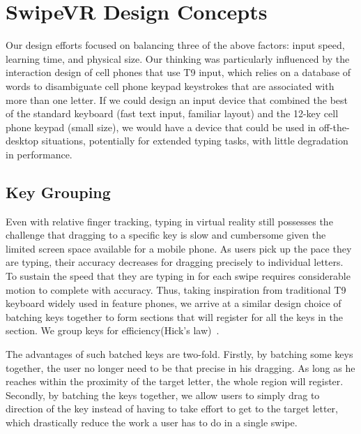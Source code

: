 \section{SwipeVR  Design Concepts }
Our design efforts focused on balancing three of the above factors: input speed, learning time, and physical size.
Our thinking was particularly influenced by the interaction design of cell phones that use T9 input, which relies on a database of words to disambiguate cell phone keypad keystrokes that are associated with more than one letter.
If we could design an input device that combined the best of the standard keyboard (fast text input, familiar layout) and the 12-key cell phone keypad (small size), we would have a device that could be used in off-the-desktop situations, potentially for extended typing tasks, with little degradation in performance. 

\subsection{Key Grouping}
Even with relative finger tracking, typing in virtual reality still possesses the challenge that dragging to a specific key is slow and cumbersome given the limited screen space available for a mobile phone.
As users pick up the pace they are typing, their accuracy decreases for dragging precisely to individual letters.
To sustain the speed that they are typing in for each swipe requires considerable motion to complete with accuracy.
Thus, taking inspiration from traditional T9 keyboard widely used in feature phones, we arrive at a similar design choice of batching keys together to form sections that will register for all the keys in the section.
We group keys for efficiency(Hick's law)~\cite{card1983psychology}.

The advantages of such batched keys are two-fold.
Firstly, by batching some keys together, the user no longer need to be that precise in his dragging.
As long as he reaches within the proximity of the target letter, the whole region will register.
Secondly, by batching the keys together, we allow users to simply drag to direction of the key instead of having to take effort to get to the target letter, which drastically reduce the work a user has to do in a single swipe.

